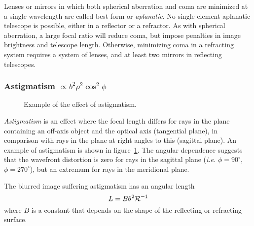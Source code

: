 \documentclass{article}
\def\cl#1{{\cal #1}}               %
\begin{document}


Lenses or mirrors in which both spherical aberration and coma are minimized at a single
wavelength are called best form or {\it aplanatic}. No single element aplanatic telescope
is possible, either in a reflector or a refractor. As with spherical aberration, a large
focal ratio will reduce coma, but impose penalties in image brightness and telescope length.
Otherwise, minimizing coma in a refracting system requires a system of lenses, and at least
two mirrors in reflecting telescopes.

\subsubsection{Astigmatism $\propto b^2\rho^2\cos^2\phi$}

\begin{figure}[th!]
  \hfil{}\hfil
  \caption{Example of the effect of astigmatism.}
  \label{fig:astigmatism-example}
\end{figure}

{\it Astigmatism} is an effect where the focal length differs for rays in the plane
containing an off-axis object and the optical axis (tangential plane),
in comparison with rays in the plane at right angles to this (sagittal plane).
An example of astigmatism is shown in figure~\ref{fig:astigmatism-example}.
The angular dependence suggests that the wavefront distortion is zero for rays
in the sagittal plane ({\it i.e.} $\phi=90^{\circ}$, $\phi=270^{\circ}$), but an extremum for
rays in the meridional plane.

The blurred image suffering astigmatism has an angular length
\[
L=B\theta^2\cl{R}^{-1}
\]
where $B$ is a constant that depends on the shape of the reflecting or refracting surface.
\end{document}
